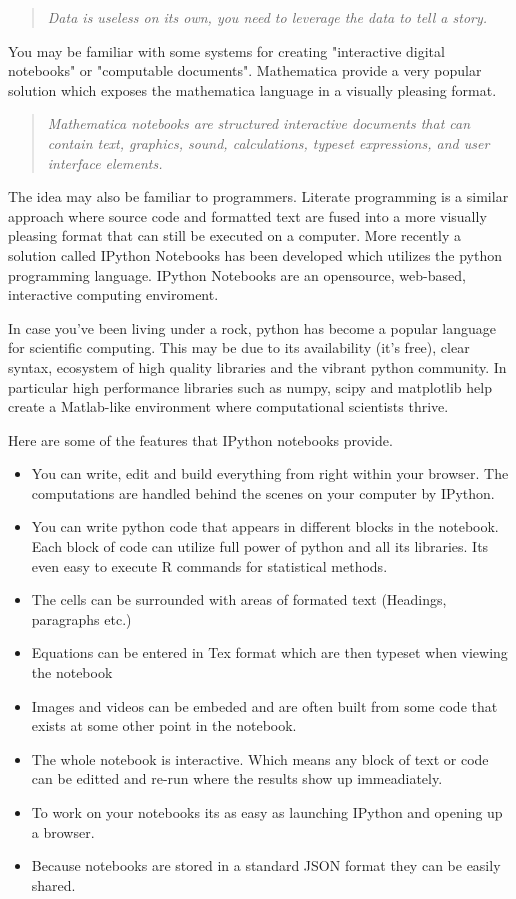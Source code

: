 \documentclass[11pt, a4paper]{article}  %
\begin{document}
\begin{multicols}{2}
\begin{quote} 
\textit {Data is useless on its own, you need to leverage the data to tell a
story.}
\end{quote}

You may be familiar with some systems for creating "interactive digital
notebooks" or "computable documents". Mathematica provide a very popular
solution which exposes the mathematica language in a visually pleasing format.

\begin{quote}
\textit{ Mathematica notebooks are structured interactive documents that can
contain text, graphics, sound, calculations, typeset expressions, and user
interface elements.}
\end{quote}

The idea may also be familiar to programmers. Literate programming is a
similar approach where source code and formatted text are fused into a more
visually pleasing format that can still be executed on a computer. More
recently a solution called IPython Notebooks has been developed which utilizes
the python programming language. IPython Notebooks are an opensource,
web-based, interactive computing enviroment.

In case you've been living under a rock, python has become a popular language
for scientific computing. This may be due to its availability (it's free),
clear syntax, ecosystem of high quality libraries and the vibrant python
community. In particular high performance libraries such as numpy, scipy and
matplotlib help create a Matlab-like environment where computational scientists
thrive.

Here are some of the features that IPython notebooks provide.

\begin{itemize}
\item You can write, edit and build everything from right within your browser.
The computations are handled behind the scenes on your computer by
IPython.
\item You can write python code that appears in different blocks in the
notebook. Each block of code can utilize full power of python and all its
libraries. Its even easy to execute R commands for statistical methods.
\item The cells can be surrounded with areas of formated text (Headings,
paragraphs etc.)
\item Equations can be entered in Tex format which are then typeset when
viewing the notebook
\item Images and videos can be embeded and are often built from some code that
exists at some other point in the notebook.
\item The whole notebook is interactive. Which means any block of text or code
can be editted and re-run where the results show up immeadiately.
\item To work on your notebooks its as easy as launching IPython and opening
up a browser.
\item Because notebooks are stored in a standard JSON format they can be
easily shared.
\end{itemize}


\end{multicols}
\end{document}
